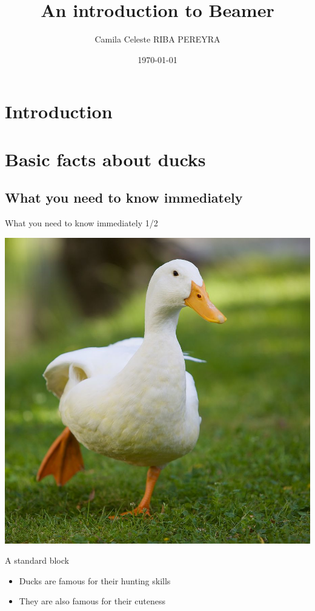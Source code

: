 \documentclass[11pt]{beamer}
\author{Camila Celeste RIBA PEREYRA}
\title{An introduction to Beamer}
\institute{ISTerre - USMB}
\date{\today}
\begin{document}
\section{Introduction}
\begin{frame}[plain]
	\titlepage
\end{frame}

\begin{frame}
\tableofcontents
\end{frame}


\section{Basic facts about ducks}
\subsection{What you need to know immediately}
\begin{frame}{What you need to know immediately 1/2}
	\begin{center}
		\includegraphics[width = .5\textwidth]{runningduck.jpg}
	\end{center}
	\begin{block} {A standard block}
		\begin{itemize}
			\item Ducks are famous for their hunting skills
			\item They are also famous for their cuteness
		\end{itemize}
	\end{block}
\end{frame}
\end{document}
